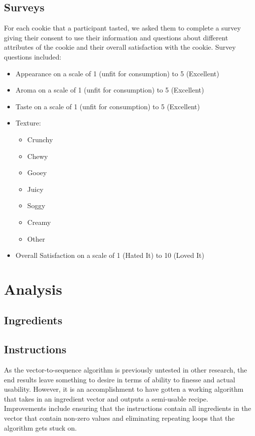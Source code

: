 \documentclass[11pt, a4paper]{article}
\begin{document}
		\subsection{Surveys}
		For each cookie that a participant tasted, we asked them to complete a survey giving their consent to use their information and questions about different attributes of the cookie and their overall satisfaction with the cookie.
		Survey questions included:
		\begin{itemize}
			\item Appearance on a scale of 1 (unfit for consumption) to 5 (Excellent) 
			\item Aroma on a scale of 1 (unfit for consumption) to 5 (Excellent) 
			\item Taste on a scale of 1 (unfit for consumption) to 5 (Excellent) 
			\item Texture:
			\begin{multicols}{2}
				\begin{itemize}
					\item Crunchy
					\item Chewy
					\item Gooey
					\item Juicy
					\item Soggy
					\item Creamy
					\item Other
				\end{itemize}
			\end{multicols}
		\item Overall Satisfaction on a scale of 1 (Hated It) to 10 (Loved It)
				
		\end{itemize}
		\section{Analysis}	
		\subsection{Ingredients}
		\subsection{Instructions}
		As the vector-to-sequence algorithm is previously untested in other research, the end results leave something to desire in terms of ability to finesse and actual usability. However, it is an accomplishment to have gotten a working algorithm that takes in an ingredient vector and outputs a semi-usable recipe. Improvements include ensuring that the instructions contain all ingredients in the vector that contain non-zero values and eliminating repeating loops that the algorithm gets stuck on.
\end{document}
